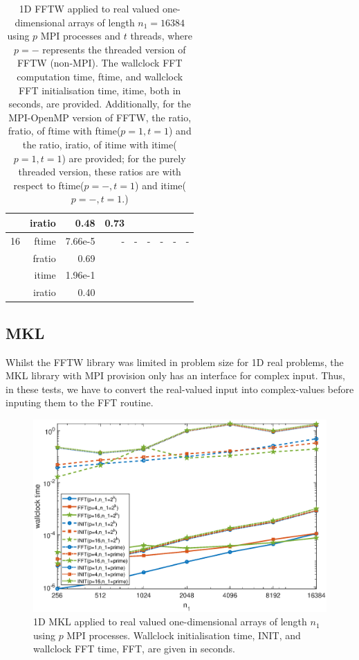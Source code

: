 \documentclass[a4]{article}
\begin{document}
\begin{table}
\begin{center}
\begin{tabular}{|r|r|r|r|r|r|r|r|r|}
      & iratio &  0.48 &   0.73  &  & & & & \\ \hline
    16 & ftime  &  7.66e-5   & - & - & - & - & - & - \\ 
     & fratio &    0.69  &  &  &  &  &  &  \\
      & itime &  1.96e-1   & & & & & & \\
      & iratio & 0.40   & & & & & & \\ \hline
\end{tabular}
\caption{1D FFTW applied to real valued one-dimensional arrays of length $n_1=16384$ using $p$ MPI processes and $t$ threads, where $p=-$ represents the threaded version of FFTW (non-MPI). The wallclock FFT computation time, ftime, and wallclock FFT initialisation time, itime, both in seconds, are provided. Additionally, for the MPI-OpenMP version of FFTW, the ratio, fratio, of ftime  with ftime($p=1,t=1$) and the ratio, iratio, of itime  with itime($p=1,t=1$) are provided; for the purely threaded version, these ratios are with respect to ftime($p=-,t=1$) and itime($p=-,t=1$.) }\label{Tbl:FFT1d16384}
\end{center}
\end{table}





\subsection{MKL}
Whilst the FFTW library was limited in problem size for 1D real problems, the MKL library with MPI provision only has an interface for complex input. Thus, in these tests, we have to convert the real-valued input into complex-values before inputing them to the FFT routine.



\begin{figure}[!htbp]
\begin{center}
 \includegraphics[width=.9\textwidth, height=0.42\textheight]{FFTW1D_times_fig.eps}
\caption{1D MKL applied to real valued one-dimensional arrays of length $n_1$ using $p$ MPI processes. Wallclock initialisation time, INIT, and wallclock FFT time, FFT, are given in seconds.}
\label{Fig:mkl1d_times}
\end{center}
\end{figure}
\end{document}
